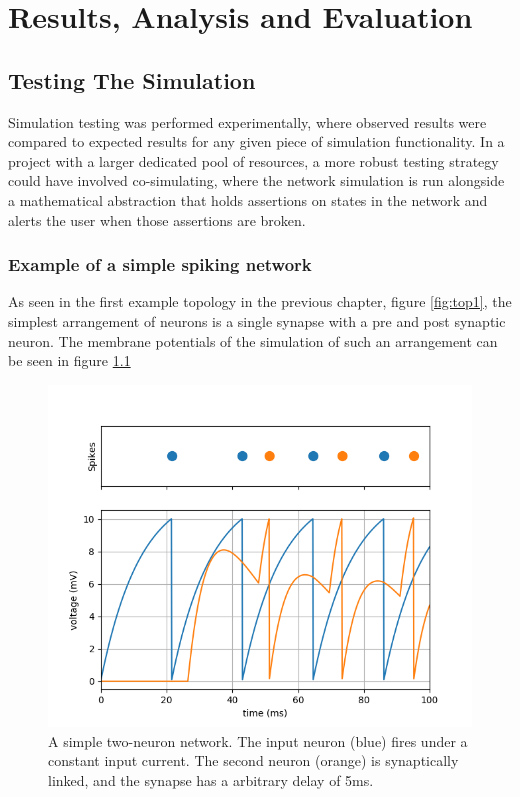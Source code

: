 

\chapter{Results, Analysis and Evaluation}

\section{Testing The Simulation}

Simulation testing was performed experimentally, where observed results were
compared to expected results for any given piece of simulation functionality. In
a project with a larger dedicated pool of resources, 
a more robust testing strategy could have involved co-simulating, where the
network simulation is run alongside a mathematical abstraction that holds
assertions on states in the network and alerts the user when those assertions
are broken.

\subsection{Example of a simple spiking network}
As seen in the first example topology in the previous chapter, figure
\ref{fig:top1}, the simplest arrangement of neurons is a single synapse with a
pre and post synaptic neuron. The membrane potentials of the simulation of such
an arrangement can be seen in figure \ref{fig:PRERES1}
\begin{figure}[h!]
    \centering
    \includegraphics[width=0.7\linewidth]{figures/graphs/DelayBugFixed.png}
    \caption[A simple two-neuron network]{A simple two-neuron network. The input neuron (blue) fires under a constant input current. The second neuron (orange) is synaptically linked, and the synapse has a arbitrary delay of 5ms.}
    \label{fig:PRERES1}
\end{figure}
